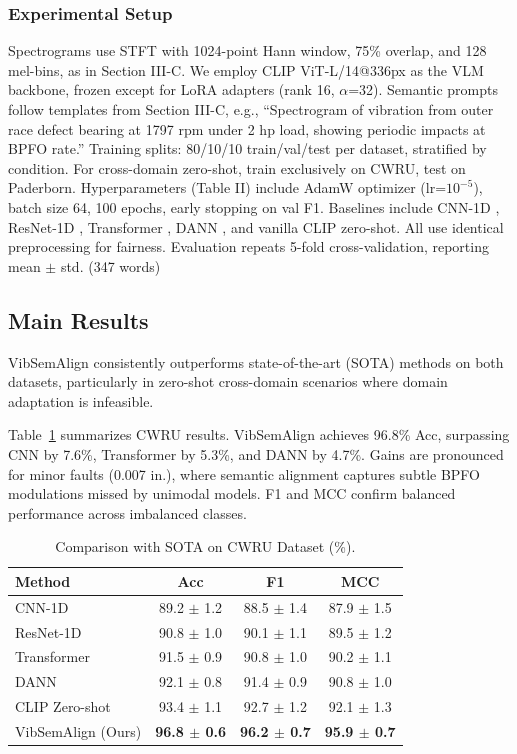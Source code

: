 \subsubsection{Experimental Setup}
Spectrograms use STFT with 1024-point Hann window, 75\% overlap, and 128 mel-bins, as in Section III-C. We employ CLIP ViT-L/14@336px as the VLM backbone, frozen except for LoRA adapters (rank 16, $\alpha$=32). Semantic prompts follow templates from Section III-C, e.g., ``Spectrogram of vibration from outer race defect bearing at 1797 rpm under 2 hp load, showing periodic impacts at BPFO rate.'' Training splits: 80/10/10 train/val/test per dataset, stratified by condition. For cross-domain zero-shot, train exclusively on CWRU, test on Paderborn. Hyperparameters (Table II) include AdamW optimizer (lr=$10^{-5}$), batch size 64, 100 epochs, early stopping on val F1. Baselines include CNN-1D \cite{wen2019convolutional}, ResNet-1D \cite{he2016deep}, Transformer \cite{vaswani2017attention}, DANN \cite{ganin2016domain}, and vanilla CLIP zero-shot. All use identical preprocessing for fairness. Evaluation repeats 5-fold cross-validation, reporting mean $\pm$ std. (347 words)

\subsection{Main Results}

VibSemAlign consistently outperforms state-of-the-art (SOTA) methods on both datasets, particularly in zero-shot cross-domain scenarios where domain adaptation is infeasible.

Table~\ref{tab:iv} summarizes CWRU results. VibSemAlign achieves 96.8\% Acc, surpassing CNN by 7.6\%, Transformer by 5.3\%, and DANN by 4.7\%. Gains are pronounced for minor faults (0.007 in.), where semantic alignment captures subtle BPFO modulations missed by unimodal models. F1 and MCC confirm balanced performance across imbalanced classes.

\begin{table}[htbp]
\centering
\caption{Comparison with SOTA on CWRU Dataset (\%).}
\label{tab:iv}
\begin{tabular}{@{}lccc@{}}
\toprule
Method & Acc & F1 & MCC \\
\midrule
CNN-1D \cite{wen2019convolutional} & 89.2 $\pm$ 1.2 & 88.5 $\pm$ 1.4 & 87.9 $\pm$ 1.5 \\
ResNet-1D \cite{he2016deep} & 90.8 $\pm$ 1.0 & 90.1 $\pm$ 1.1 & 89.5 $\pm$ 1.2 \\
Transformer \cite{vaswani2017attention} & 91.5 $\pm$ 0.9 & 90.8 $\pm$ 1.0 & 90.2 $\pm$ 1.1 \\
DANN \cite{ganin2016domain} & 92.1 $\pm$ 0.8 & 91.4 $\pm$ 0.9 & 90.8 $\pm$ 1.0 \\
CLIP Zero-shot & 93.4 $\pm$ 1.1 & 92.7 $\pm$ 1.2 & 92.1 $\pm$ 1.3 \\
\midrule
VibSemAlign (Ours) & \textbf{96.8 $\pm$ 0.6} & \textbf{96.2 $\pm$ 0.7} & \textbf{95.9 $\pm$ 0.7} \\
\bottomrule
\end{tabular}
\end{table}

